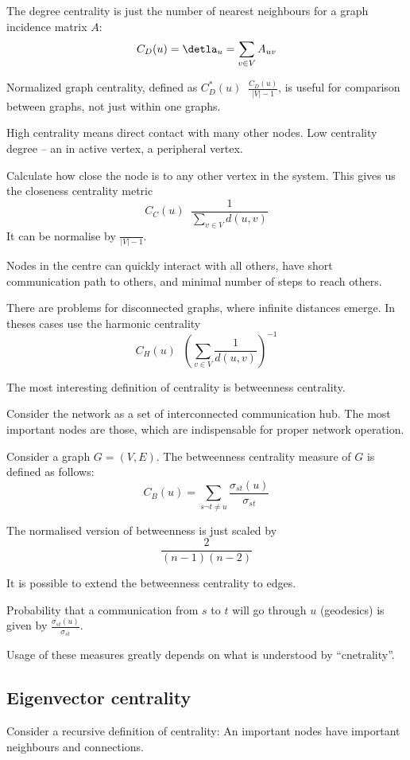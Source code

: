 \documentclass[a4paper]{article}
\newcommand{\brac}[1]{{\left ( #1 \right )}}
\newcommand{\abs}[1]{{\left | #1 \right |}}
\newcommand{\defn}{\mathop{\overset{\Delta}{=}}\nolimits}
\begin{document}
The degree centrality is just the number of nearest neighbours for a graph incidence matrix $A$:
\[C_D(u) = \detla_u = \sum_{v\in V} A_{uv}\]

Normalized graph centrality, defined as $C_D^*(u) \defn \frac{C_D(u)}{\abs{V}-1}$, is useful for comparison between graphs, not just within one graphs.

High centrality means direct contact with many other nodes. Low centrality degree -- an in active vertex, a peripheral vertex.

Calculate how close the node is to any other vertex in the system. This gives us the closeness centrality metric
\[C_C(u) \defn \frac{1}{\sum_{v\in V} d(u,v)}\]
It can be normalise by $\tfrac{}{\abs{V}-1}$.

Nodes in the centre can quickly interact with all others, have short communication path to others, and minimal number of steps to reach others.

There are problems for disconnected graphs, where infinite distances emerge. In theses cases use the harmonic centrality
\[C_H(u)\defn \brac{\sum_{v\in V} \frac{1}{d(u,v)}}^{-1}\]

The most interesting definition of centrality is betweenness centrality.

Consider the network as a set of interconnected communication hub. The most important nodes are those, which are indispensable for proper network operation. 

Consider a graph $G = \brac{V,E}$.
The betweenness centrality measure of $G$ is defined as follows:
\[C_B(u) = \sum_{s\neg t\neq u}\frac{\sigma_{st}(u)}{\sigma_{st}}\] 

The normalised version of betweenness is just scaled by
\[\frac{2}{(n-1)(n-2)}\]

It is possible to extend the betweenness centrality to edges.

Probability that a communication from $s$ to $t$ will go through $u$ (geodesics) is given by $\frac{\sigma_{st}(u)}{\sigma_{st}}$.

Usage of these measures greatly depends on what is understood by ``cnetrality''.

\subsection{Eigenvector centrality} %
\label{sub:eigenvector_centrality}

Consider a recursive definition of centrality: An important nodes have important neighbours and connections.
\end{document}
